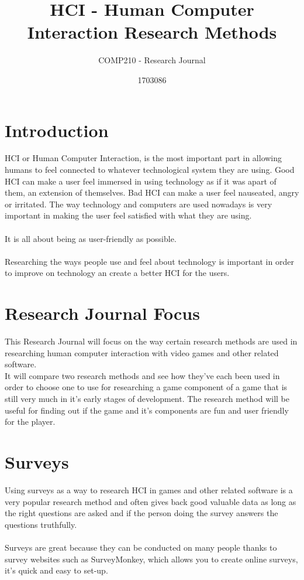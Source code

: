 \documentclass{scrartcl}
\title{HCI - Human Computer Interaction Research Methods}
\subtitle{COMP210 - Research Journal}
\author{1703086}
\begin{document}
\maketitle


\section{Introduction}
HCI or Human Computer Interaction, is the most important part in allowing humans to feel connected to whatever technological system they are using. Good HCI can make a user feel immersed in using technology as if it was apart of them, an extension of themselves. Bad HCI can make a user feel nauseated, angry or irritated.
The way technology and computers are used nowadays is very important in making the user feel satisfied with what they are using.
\\
\\
It is all about being as user-friendly as possible.
\\
\\
Researching the ways people use and feel about technology is important in order to improve on technology an create a better HCI for the users.

\section{Research Journal Focus}
This Research Journal will focus on the way certain research methods are used in researching human computer interaction with video games and other related software.
\\
It will compare two research methods and see how they've each been used in order to choose one to use for researching a game component of a game that is still very much in it's early stages of development.
The research method will be useful for finding out if the game and it's components are fun and user friendly for the player.

\section{Surveys}
Using surveys as a way to research HCI in games and other related software is a very popular research method and often gives back good valuable data as long as the right questions are asked and if the person doing the survey answers the questions truthfully.
\\
\\
Surveys are great because they can be conducted on many people thanks to survey websites such as SurveyMonkey, which allows you to create online surveys, it's quick and easy to set-up.
\end{document}
